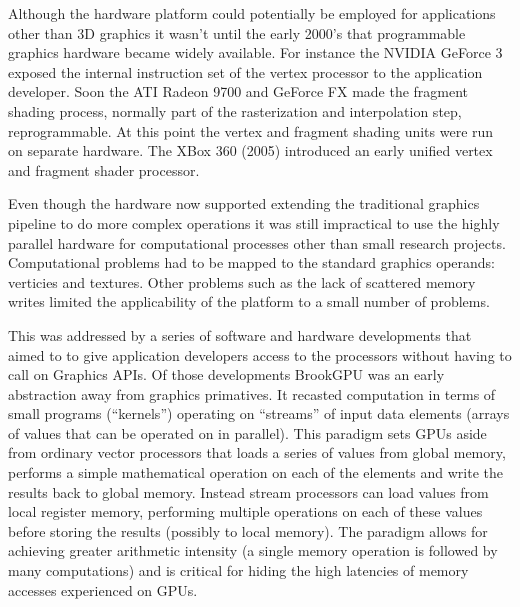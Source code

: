 Although the hardware platform could potentially be employed for applications other than 3D graphics it wasn't until the early 2000's that programmable graphics hardware became widely
available. For instance the NVIDIA GeForce 3 exposed the internal instruction set of the vertex processor to the application developer. Soon the ATI Radeon 9700 and GeForce FX 
made the fragment shading process, normally part of the rasterization and interpolation step, reprogrammable. At this point the vertex and fragment shading units were run on separate
hardware. The XBox 360 (2005) introduced an early unified vertex and fragment shader processor.

Even though the hardware now supported extending the traditional graphics pipeline to do more complex operations it was still impractical to use the highly parallel hardware for 
computational processes other than small research projects. Computational problems had to be mapped to the standard graphics operands: verticies and textures. Other problems
such as the lack of scattered memory writes limited the applicability of the platform to a small number of problems.

This was addressed by a series of software and hardware developments that aimed to to give application developers access to the processors without having to call
on Graphics APIs. Of those developments BrookGPU \cite{buck2004brook} was an early abstraction away from graphics primatives. It recasted computation in terms of small programs (``kernels'') operating
on ``streams'' of input data elements (arrays of values that can be operated on in parallel). This paradigm sets GPUs aside from ordinary vector processors that loads a series of values from global
memory, performs a simple mathematical operation on each of the elements and write the results back to global memory. Instead stream processors can load values from local register memory, performing multiple
operations on each of these values before storing the results (possibly to local memory). The paradigm allows for achieving greater arithmetic intensity (a single memory operation is followed
by many computations) and is critical for hiding the high latencies of memory accesses experienced on GPUs. 

